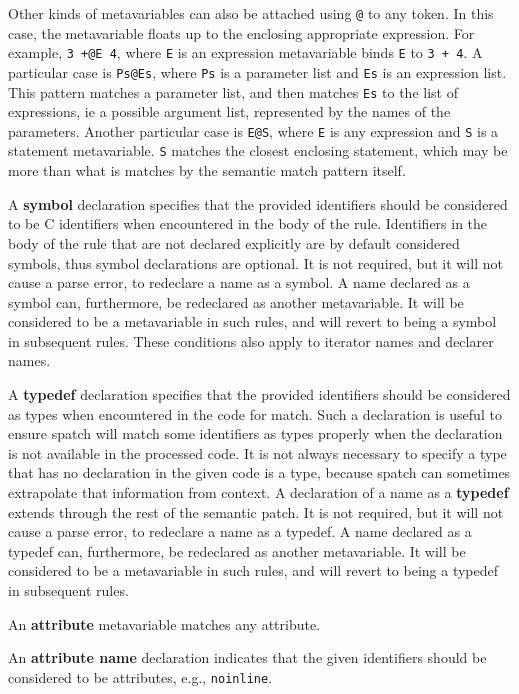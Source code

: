 Other kinds of metavariables can also be attached using \texttt{@} to any
token.  In this case, the metavariable floats up to the enclosing
appropriate expression.  For example, {\tt 3 +@E 4}, where {\tt E} is an
expression metavariable binds {\tt E} to {\tt 3 + 4}.  A particular case is
{\tt Ps@Es}, where {\tt Ps} is a parameter list and {\tt Es} is an
expression list.  This pattern matches a parameter list, and then matches
{\tt Es} to the list of expressions, ie a possible argument list,
represented by the names of the parameters.  Another particular case is
{\tt E@S}, where {\tt E} is any expression and {\tt S} is a statement
metavariable.  {\tt S} matches the closest enclosing statement, which may
be more than what is matches by the semantic match pattern itself.

A {\bf symbol} declaration specifies that the provided identifiers should
be considered to be C identifiers when encountered in the body of the rule.
Identifiers in the body of the rule that are not declared explicitly are by
default considered symbols, thus symbol declarations are optional. It is
not required, but it will not cause a parse error, to redeclare a name as a
symbol. A name declared as a symbol can, furthermore, be redeclared as another
metavariable. It will be considered to be a metavariable in such rules,
and will revert to being a symbol in subsequent rules. These conditions
also apply to iterator names and declarer names.

A {\bf typedef} declaration specifies that the provided identifiers should be
considered as types when encountered in the code for match. Such a declaration
is useful to ensure spatch will match some identifiers as types properly when
the declaration is not available in the processed code. It is not always
necessary to specify a type that has no declaration in the given code is a type,
because spatch can sometimes extrapolate that information from context.
A declaration of a name as a {\bf typedef} extends through the rest of the
semantic patch. It is not required, but it will not cause a parse error, to
redeclare a name as a typedef. A name declared as a typedef can, furthermore, be
redeclared as another metavariable. It will be considered to be a metavariable
in such rules, and will revert to being a typedef in subsequent rules.

An {\bf attribute} metavariable matches any attribute.

An {\bf attribute name} declaration indicates that the given identifiers should be
considered to be attributes, e.g., \texttt{noinline}.

